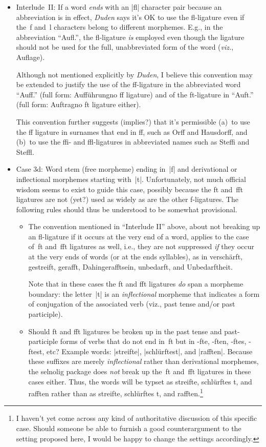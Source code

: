 \documentclass[11pt]{article}
\newcommand{\pkg}[1]{\textsf{#1}}
\begin{document}
\begin{itemize}
\begin{itemize}
\item Interlude~II: If a word \emph{ends} with an |fl| character pair because an abbreviation is in effect, \emph{Duden} says it's OK to use the fl-ligature even if the~f and~l characters belong to different morphemes. E.g., in the abbreviation \enquote{Aufl.}, the fl-ligature \emph{is} employed even though the ligature should not be used for the full, unabbreviated form of the word (\emph{viz.}, Auflage).

Although not mentioned explicitly by \emph{Duden}, I believe this convention may be extended to justify the use of the ff-ligature in the abbreviated word \enquote{Auff.} (full form: Aufführung\textemdash no ff ligature) and of the ft-ligature in \enquote{Auft.} (full form: Auftrag\textemdash no ft ligature either).

This convention further suggests (implies?) that it's permissible (a)~to use the ff ligature in surnames that end in ff, such as Orff and Hausdorff, and (b)~to use the ffi- and ffl-ligatures in abbreviated names such as Steffi and Steffl. 

\item Case 3d: Word stem (free morpheme) ending in~|f| and derivational or inflectional morphemes starting with~|t|. Unfortunately, not much official wisdom seems to exist to guide this case, possibly because the ft and~fft ligatures are not (yet?) used as widely as are the other f-ligatures. The following rules should thus be understood to be somewhat provisional.

\begin{itemize}
\item The convention mentioned in \enquote{Interlude II} above, about not breaking up an fl-ligature if it occurs at the very end of a word, applies to the case of~ft and~fft ligatures as well, i.e., they are not suppressed \emph{if} they occur at the very ends of words (or at the ends syllables), as in verschärft, gestreift, gerafft, Dahingerafftsein, unbedarft, and Unbedarftheit. 

Note that in these cases the ft and fft ligatures \emph{do} span a morpheme boundary: the letter~|t| is an \emph{inflectional} morpheme that indicates a form of conjugation of the associated verb (viz., past tense and/or past participle).

\item Should ft and fft ligatures be broken up in the past tense and past-participle forms of verbs that do not end in~ft but in -fte, -ften, -ftes, -ftest, etc? Example words: |streifte|, |schlürftest|, and |rafften|. Because these suffixes are merely \emph{inflectional} rather than derivational morphemes, the \pkg{selnolig} package does \emph{not} break up the~ft and~fft ligatures in these cases either. Thus, the words will be typset as streifte, schlürftes\kern0pt t, and rafften rather than as streif\breaklig te, schlürf\breaklig tes\kern0pt t, and raff\breaklig ten.\footnote{I haven't yet come across any kind of authoritative discussion of this specific case. Should someone be able to furnish a good counterargument to the setting proposed here, I would be happy to change the settings accordingly.}


\end{itemize}
\end{itemize}
\end{itemize}
\end{document}

